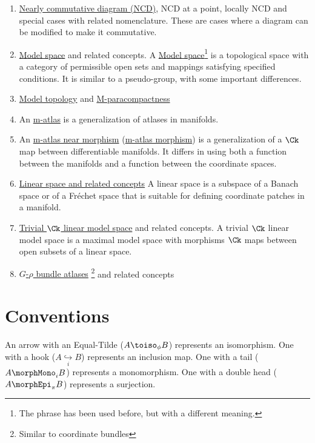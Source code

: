 \documentclass{article}
\begin{document}
\begin{enumerate}
\item \hyperref[def:NCD]{Nearly commutative diagram (NCD)}, NCD at a point,
locally NCD and special cases with related nomenclature.
These are cases where a diagram can be modified to make it commutative.

\item\hyperref[def:model]{Model space} and related concepts.
A \hyperref[def:model]{Model space}\footnote{
  The phrase has been used before, but with a different meaning.
}
is a topological space with a category of permissible open sets and
mappings satisfying specified conditions.  It is similar to a
pseudo-group, with some important differences.

\item \hyperref[def:ModTop]{Model topology} and
\hyperref[def:M-para]{M-paracompactness}

\item
An \hyperref[def:M-atlas]{m-atlas} is a generalization of atlases in
manifolds.

\item
An \hyperref[def:M-ATLmorphnear]{m-atlas near morphism}
(\hyperref[def:M-ATLmorph]{m-atlas morphism}) is a generalization of a
$\Ck$ map between differentiable manifolds. It differs in using both a
function between the manifolds and a function between the coordinate
spaces.

\item
\hyperref[def:lin]{Linear space and related concepts}
A linear space is a subspace of a Banach space or of a Fr\'echet space
that is suitable for defining coordinate patches in a manifold.

\item
\hyperref[def:trivck]{Trivial $\Ck$ linear model space} and related
concepts.
A trivial $\Ck$ linear model space is a maximal model space
with morphisms $\Ck$ maps between open subsets of a linear space.

\item \hyperref[def:BunAtl]{$G$-$\rho$ bundle atlases}%
\footnote{Similar to coordinate bundles}
and related concepts
\end{enumerate}

\part {Conventions}
\label{part:conv}
An arrow with an Equal-Tilde ($A \toiso_\phi B$) represents an
isomorphism. One with a hook ($A \underset{i}{\hookrightarrow} B$)
represents an inclusion map. One with a tail ($A \morphMono_i B$) represents
a monomorphism. One with a double head ($A \morphEpi_\pi B$) represents a
surjection.
\end{document}
